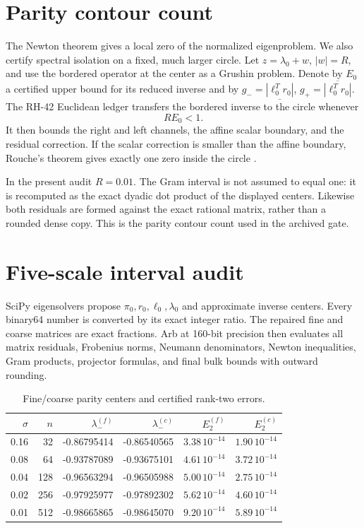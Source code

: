 \documentclass[11pt]{article}
\theoremstyle{definition}
\begin{document}
\section{Parity contour count}
\label{sec:contour}

The Newton theorem gives a local zero of the normalized eigenproblem.  We
also certify spectral isolation on a fixed, much larger circle.  Let
$z=\lambda_0+w$, $|w|=R$, and use the bordered operator at the center as a
Grushin problem.  Denote by $E_0$ a certified upper bound for its reduced
inverse and by $g_-=\underline{|\ell_0^Tr_0|}$,
$g_+=\overline{|\ell_0^Tr_0|}$.  The RH-42 Euclidean ledger transfers the
bordered inverse to the circle whenever
\begin{equation}
 R E_0<1.
 \label{eq:transport}
\end{equation}
It then bounds the right and left channels, the affine scalar boundary, and
the residual correction.  If the scalar correction is smaller than the
affine boundary, Rouche's theorem gives exactly one zero inside the circle
\citep{WangContour2026}.

In the present audit $R=0.01$.  The Gram interval is not assumed to equal
one: it is recomputed as the exact dyadic dot product of the displayed
centers.  Likewise both residuals are formed against the exact rational
matrix, rather than a rounded dense copy.  This is the parity contour count
used in the archived gate.

\section{Five-scale interval audit}
\label{sec:audit}

SciPy eigensolvers propose $\pi_0,r_0,\ell_0,\lambda_0$ and approximate
inverse centers.  Every binary64 number is converted by its exact integer
ratio.  The repaired fine and coarse matrices are exact fractions.  Arb at
160-bit precision then evaluates all matrix residuals, Frobenius norms,
Neumann denominators, Newton inequalities, Gram products, projector formulas,
and final bulk bounds with outward rounding.

\begin{table}[H]
\centering
\small
\caption{Fine/coarse parity centers and certified rank-two errors.}
\label{tab:main}
\begin{tabular}{@{}rrrrrr@{}}
\toprule
$\sigma$ & $n$ & $\lambda_-^{(f)}$ & $\lambda_-^{(c)}$ &
$E_2^{(f)}$ & $E_2^{(c)}$\\
\midrule
0.16 & 32  & -0.86795414 & -0.86540565 & $3.38\,10^{-14}$ & $1.90\,10^{-14}$\\
0.08 & 64  & -0.93787089 & -0.93675101 & $4.61\,10^{-14}$ & $3.72\,10^{-14}$\\
0.04 & 128 & -0.96563294 & -0.96505988 & $5.00\,10^{-14}$ & $2.75\,10^{-14}$\\
0.02 & 256 & -0.97925977 & -0.97892302 & $5.62\,10^{-14}$ & $4.60\,10^{-14}$\\
0.01 & 512 & -0.98665865 & -0.98645070 & $9.20\,10^{-14}$ & $5.89\,10^{-14}$\\
\bottomrule
\end{tabular}
\end{table}
\end{document}
